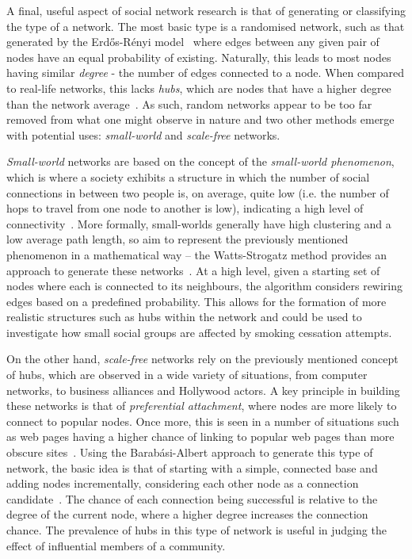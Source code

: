 \documentclass[]{report}
\begin{document}
A final, useful aspect of social network research is that of generating or classifying the type of a network. The most basic type is a randomised network, such as that generated by the Erd\H{o}s-R\'{e}nyi model~\cite{erdos} where edges between any given pair of nodes have an equal probability of existing. Naturally, this leads to most nodes having similar \emph{degree} - the number of edges connected to a node. When compared to real-life networks, this lacks \emph{hubs}, which are nodes that have a higher degree than the network average~\cite{BA-SciAm}. As such, random networks appear to be too far removed from what one might observe in nature and two other methods emerge with potential uses: \emph{small-world} and \emph{scale-free} networks.

\emph{Small-world} networks are based on the concept of the \emph{small-world phenomenon}, which is where a society exhibits a structure in which the number of social connections in between two people is, on average, quite low (i.e. the number of hops to travel from one node to another is low), indicating a high level of connectivity~\cite{milgram}. More formally, small-worlds generally have high clustering and a low average path length, so aim to represent the previously mentioned phenomenon in a mathematical way – the Watts-Strogatz method provides an approach to generate these networks~\cite{small-world}. At a high level, given a starting set of nodes where each is connected to its neighbours, the algorithm considers rewiring edges based on a predefined probability. This allows for the formation of more realistic structures such as hubs within the network and could be used to investigate how small social groups are affected by smoking cessation attempts.

On the other hand, \emph{scale-free} networks rely on the previously mentioned concept of hubs, which are observed in a wide variety of situations, from computer networks, to business alliances and Hollywood actors. A key principle in building these networks is that of \emph{preferential attachment}, where nodes are more likely to connect to popular nodes. Once more, this is seen in a number of situations such as web pages having a higher chance of linking to popular web pages than more obscure sites~\cite{BA-SciAm}. Using the Barab\'{a}si-Albert approach to generate this type of network, the basic idea is that of starting with a simple, connected base and adding nodes incrementally, considering each other node as a connection candidate~\cite{BAStat}. The chance of each connection being successful is relative to the degree of the current node, where a higher degree increases the connection chance. The prevalence of hubs in this type of network is useful in judging the effect of influential members of a community.
\end{document}
